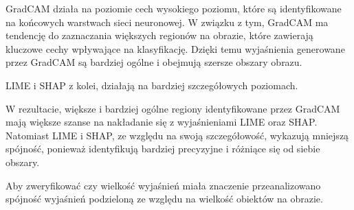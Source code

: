 GradCAM działa na poziomie cech wysokiego poziomu, które są identyfikowane na końcowych warstwach sieci neuronowej.
W związku z tym, GradCAM ma tendencję do zaznaczania większych regionów na obrazie, które zawierają kluczowe cechy wpływające na klasyfikację.
Dzięki temu wyjaśnienia generowane przez GradCAM są bardziej ogólne i obejmują szersze obszary obrazu.

LIME i SHAP z kolei, działają na bardziej szczegółowych poziomach.

W rezultacie, większe i bardziej ogólne regiony identyfikowane przez GradCAM mają większe szanse na nakładanie się z wyjaśnieniami LIME oraz SHAP.
Natomiast LIME i SHAP, ze względu na swoją szczegółowość, wykazują mniejszą spójność, ponieważ identyfikują bardziej precyzyjne i różniące się od siebie obszary.

Aby zweryfikować czy wielkość wyjaśnień miała znaczenie przeanalizowano spójność wyjaśnień podzieloną ze względu na wielkość obiektów na obrazie.

